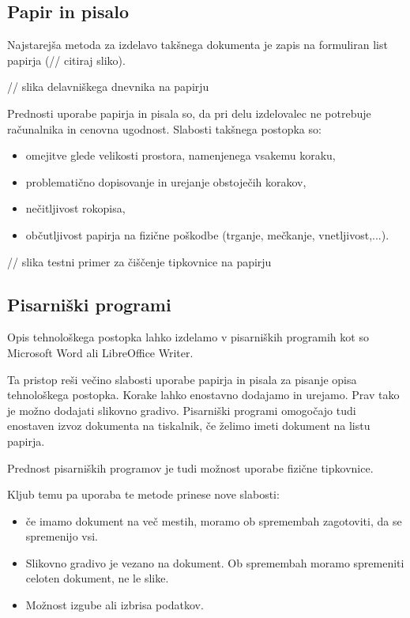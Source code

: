 \documentclass[a4paper, 12pt]{book}
\begin{document}
\subsection{Papir in pisalo}

Najstarejša metoda za izdelavo takšnega dokumenta je zapis na formuliran list papirja (// citiraj sliko).

// slika delavniškega dnevnika na papirju

Prednosti uporabe papirja in pisala so, da pri delu izdelovalec ne potrebuje računalnika in cenovna ugodnost.
Slabosti takšnega postopka so:
\begin{itemize}
	\item omejitve glede velikosti prostora, namenjenega vsakemu koraku,
	\item problematično dopisovanje in urejanje obstoječih korakov,
	\item nečitljivost rokopisa,
	\item občutljivost papirja na fizične poškodbe (trganje, mečkanje, vnetljivost,...).
\end{itemize}

// slika testni primer za čiščenje tipkovnice na papirju

\subsection{Pisarniški programi}

Opis tehnološkega postopka lahko izdelamo v pisarniških programih kot so Microsoft Word ali LibreOffice Writer.

Ta pristop reši večino slabosti uporabe papirja in pisala za pisanje opisa tehnološkega postopka.
Korake lahko enostavno dodajamo in urejamo.
Prav tako je možno dodajati slikovno gradivo.
Pisarniški programi omogočajo tudi enostaven izvoz dokumenta na tiskalnik, če želimo imeti dokument na listu papirja.

Prednost pisarniških programov je tudi možnost uporabe fizične tipkovnice.

Kljub temu pa uporaba te metode prinese nove slabosti:
\begin{itemize}
	\item če imamo dokument na več mestih, moramo ob spremembah zagotoviti, da se spremenijo vsi.
	\item Slikovno gradivo je vezano na dokument. Ob spremembah moramo spremeniti celoten dokument, ne le slike.
	\item Možnost izgube ali izbrisa podatkov.
\end{itemize}
\end{document}
